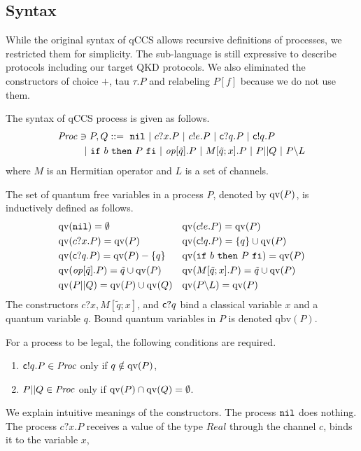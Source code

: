\subsection{Syntax}
While the original syntax of qCCS allows
recursive definitions of processes, we restricted them for simplicity.
The 
sub-language is still expressive to describe protocols including 
our target QKD protocols. We also eliminated the constructors of 
choice $+$, tau $\tau.P$ and relabeling $P[f]$
because we do not use them.
\begin{defi}
The syntax of qCCS process is given as follows.
\begin{align*}
 \mathit{Proc} \ni P,Q &::= ~\mathtt{nil} ~|~ c?x.P ~|~ c!e.P ~|~
\mathsf{c}? q.P ~|~\mathsf{c}! q.P \\
 ~|~ \mathtt{if}~b&~\mathtt{then}~P~\mathtt{fi}
 ~|~ \mathit{op}[\tilde q].P ~|~ M[\tilde q;x].P~|~P||Q~|~P\backslash L
\end{align*}
where $M$ is an Hermitian operator and 
$L$ is a set of channels.

The set of quantum free variables in a process $P$, denoted
by $\mathrm{qv}(P)$, is inductively defined as follows. 
\begin{align*}
 &\mathrm{qv}(\mathtt{nil}) = \emptyset
 &&\mathrm{qv}(c!e.P) = \mathrm{qv}(P)\\
 &\mathrm{qv}(c?x.P) = \mathrm{qv}(P)
 &&\mathrm{qv}(\mathsf{c}! q.P) = \{q\} \cup \mathrm{qv}(P)\\
 &\mathrm{qv}(\mathsf{c}? q.P) = \mathrm{qv}(P) - \{q\}
 &&\mathrm{qv}(\mathtt{if}~b~\mathtt{then}~P~\mathtt{fi}) = \mathrm{qv}(P)\\
 &\mathrm{qv}(\mathit{op}[\tilde q].P) = \tilde q \cup \mathrm{qv}(P)
 &&\mathrm{qv}(M[\tilde q;x].P) = \tilde q \cup \mathrm{qv}(P)\\
 &\mathrm{qv}(P||Q) = \mathrm{qv}(P) \cup \mathrm{qv}(Q)
 &&\mathrm{qv}(P \backslash L) = \mathrm{qv}(P)
\end{align*}
The constructors $c?x, M[\tilde q;x]$, and $\mathsf{c}? q$ bind
a classical variable $x$ and a quantum variable $q$.
Bound quantum variables in $P$ is denoted $\mathrm{qbv}(P)$.

For a process to be legal, the following conditions are required.
\begin{enumerate}
\item $\mathsf{c}! q.P \in \mathit{Proc}$ only if $q \notin \mathrm{qv}(P)$,
\item $P||Q \in \mathit{Proc}$ only if $\mathrm{qv}(P) \cap \mathrm{qv}(Q) = \emptyset$.
\end{enumerate}
\end{defi}
We explain intuitive meanings of the constructors. The process $\mathtt{nil}$
does nothing. The process $c?x.P$ receives a value of the type 
$\mathit{Real}$ through the channel $c$, binds it to the variable $x$,
